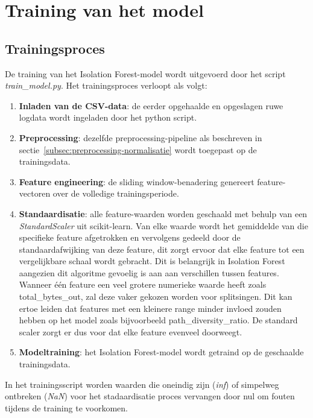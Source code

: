 \section{Training van het model} 
\label{sec:training-model}

\subsection{Trainingsproces} 
\label{subsec:trainingsproces}

De training van het Isolation Forest-model wordt uitgevoerd door het script \textit{train\_model.py}. Het trainingsproces verloopt als volgt:

\begin{enumerate}
    \item \textbf{Inladen van de CSV-data}: de eerder opgehaalde en opgeslagen ruwe logdata wordt ingeladen door het python script.
    \item \textbf{Preprocessing}: dezelfde preprocessing-pipeline als beschreven in sectie~\ref{subsec:preprocessing-normalisatie} wordt toegepast op de trainingsdata.
    \item \textbf{Feature engineering}: de sliding window-benadering genereert feature-vectoren over de volledige trainingsperiode.
    \item \textbf{Standaardisatie}: alle feature-waarden worden geschaald met behulp van een \textit{StandardScaler} uit scikit-learn. Van elke waarde wordt het gemiddelde van die specifieke feature afgetrokken en vervolgens gedeeld door de standaardafwijking van deze feature, dit zorgt ervoor dat elke feature tot een vergelijkbare schaal wordt gebracht. Dit is belangrijk in Isolation Forest aangezien dit algoritme gevoelig is aan aan verschillen tussen features. Wanneer één feature een veel grotere numerieke waarde heeft zoals total\_bytes\_out, zal deze vaker gekozen worden voor splitsingen. Dit kan ertoe leiden dat features met een kleinere range minder invloed zouden hebben op het model zoals bijvoorbeeld path_diversity_ratio. De standard scaler zorgt er dus voor dat elke feature evenveel doorweegt. 
    \item \textbf{Modeltraining}: het Isolation Forest-model wordt getraind op de geschaalde trainingsdata.
\end{enumerate}

In het trainingsscript worden waarden die oneindig zijn (\textit{inf}) of simpelweg ontbreken (\textit{NaN}) voor het stadaardisatie proces vervangen door nul om fouten tijdens de training te voorkomen.


